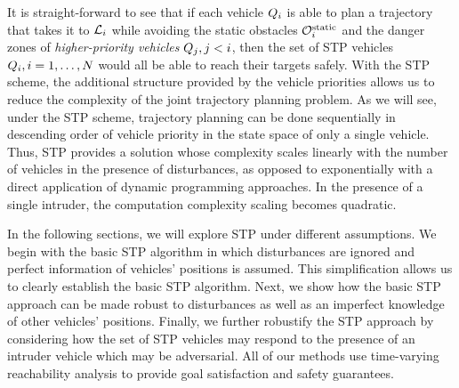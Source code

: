 It is straight-forward to see that if each vehicle $Q_i$ is able to plan a trajectory that takes it to $\mathcal{L}_i$ while avoiding the static obstacles $\mathcal{O}^\text{static}_i$ and the danger zones of \textit{higher-priority vehicles} $Q_j, j<i$, then the set of STP vehicles $Q_i, i=1,\ldots,N$ would all be able to reach their targets safely. With the STP scheme, the additional structure provided by the vehicle priorities allows us to reduce the complexity of the joint trajectory planning problem. As we will see, under the STP scheme, trajectory planning can be done sequentially in descending order of vehicle priority in the state space of only a single vehicle. Thus, STP provides a solution whose complexity scales linearly with the number of vehicles in the presence of disturbances, as opposed to exponentially with a direct application of dynamic programming approaches. In the presence of a single intruder, the computation complexity scaling becomes quadratic. 

In the following sections, we will explore STP under different assumptions. We begin with the basic STP algorithm in which disturbances are ignored and perfect information of vehicles' positions is assumed. This simplification allows us to clearly establish the basic STP algorithm. Next, we show how the basic STP approach can be made robust to disturbances as well as an imperfect knowledge of other vehicles' positions. Finally, we further robustify the STP approach by considering how the set of STP vehicles may respond to the presence of an intruder vehicle which may be adversarial. All of our methods use time-varying reachability analysis to provide goal satisfaction and safety guarantees.